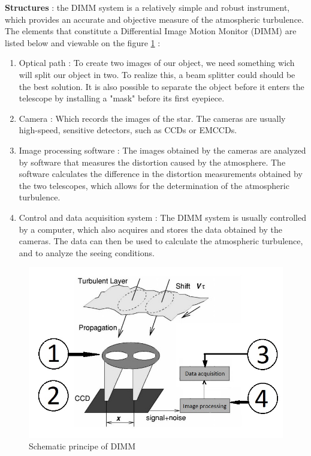 \bigbreak
\textbf{Structures} : \newline the DIMM system is a relatively simple and robust instrument, which provides an accurate and objective measure of the atmospheric turbulence.
The elements that constitute a Differential Image Motion Monitor (DIMM) are listed below and viewable on the figure
\ref{fig:DIMM_Schematic} :
\begin{enumerate}
    \item Optical path : To create two images of our object, we need something wich will split our object in two. To realize this, a beam splitter could
          should be the best solution. It is also possible to separate the object before it enters the telescope by installing a "mask" before its first
          eyepiece.
    \item Camera : Which records the images of the star. The cameras are usually high-speed, sensitive detectors, such as CCDs or EMCCDs.
    \item Image processing software : The images obtained by the cameras are analyzed by software that measures the distortion caused by the atmosphere.
          The software calculates the difference in the distortion measurements obtained by the two telescopes, which allows for the determination of the
          atmospheric turbulence.
    \item Control and data acquisition system : The DIMM system is usually controlled by a computer, which also acquires and stores the data obtained by
          the cameras. The data can then be used to calculate the atmospheric turbulence, and to analyze the seeing conditions.
\end{enumerate}
\begin{figure}[H]
    \centering
    \includegraphics{assets/figures/Theory/DIMM_Schematic.jpg}
    \caption{Schematic principe of DIMM}
    \label{fig:DIMM_Schematic}
\end{figure}

